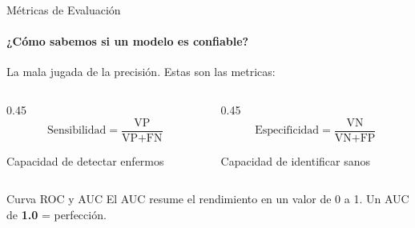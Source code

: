 \begin{frame}{Métricas de Evaluación}
\framesubtitle{¿Cómo sabemos si un modelo es confiable?}

La mala jugada de la \alert{precisión}. Estas son las metricas:

\vspace{4pt}

\begin{columns}[T]
\begin{column}{0.45\textwidth}
\[
\text{Sensibilidad} = \frac{\text{VP}}{\text{VP} + \text{FN}}
\]
\begin{center}
{\small\color{muted} Capacidad de detectar enfermos}
\end{center}
\end{column}
\begin{column}{0.45\textwidth}
\[
\text{Especificidad} = \frac{\text{VN}}{\text{VN} + \text{FP}}
\]
\begin{center}
{\small\color{muted} Capacidad de identificar sanos}
\end{center}
\end{column}
\end{columns}

\vfill

\begin{alertblock}{\faChartArea\; Curva ROC y AUC}
El AUC resume el rendimiento en un valor de 0 a 1. Un AUC de \textbf{1.0} = perfección.
\end{alertblock}

\end{frame}
